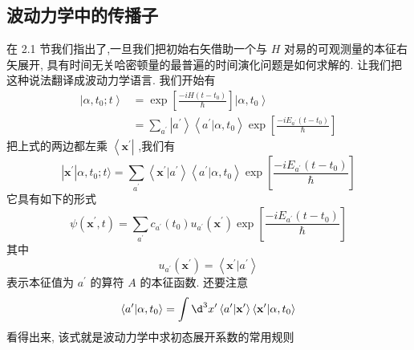 \subsection{波动力学中的传播子}
在 2.1 节我们指出了,一旦我们把初始右矢借助一个与 $H$ 对易的可观测量的本征右矢展开, 具有时间无关哈密顿量的最普遍的时间演化问题是如何求解的. 让我们把这种说法翻译成波动力学语言. 我们开始有
\begin{equation}
\begin{aligned}
	\left| {\alpha ,{t}_{0};t}\right\rangle &= \exp \left\lbrack \frac{-{iH}\left( {t - {t}_{0}}\right) }{\hbar }\right\rbrack \left| {\alpha ,{t}_{0}}\right\rangle\\
	&= \mathop{\sum }\limits_{{a}^{\prime }}\left| {a}^{\prime }\right\rangle \left\langle {{a}^{\prime } | \alpha ,{t}_{0}}\right\rangle \exp \left\lbrack \frac{-i{E}_{{a}^{\prime }}\left( {t - {t}_{0}}\right) }{\hbar }\right\rbrack
\end{aligned}
\end{equation}
把上式的两边都左乘 $\left\langle {\mathbf{x}}^{\prime }\right|$ ,我们有
\begin{equation}
\left| {\mathbf{x}}^{\prime }\right| \alpha ,{t}_{0};t\rangle = \mathop{\sum }\limits_{{a}^{\prime }}\left\langle {{\mathbf{x}}^{\prime } | {a}^{\prime }}\right\rangle \left\langle {{a}^{\prime } | \alpha ,{t}_{0}}\right\rangle \exp \left\lbrack \frac{-i{E}_{{a}^{\prime }}\left( {t - {t}_{0}}\right) }{\hbar }\right\rbrack
\end{equation}
它具有如下的形式
\begin{equation}
\psi \left( {{\mathbf{x}}^{\prime }, t}\right) = \mathop{\sum }\limits_{{a}^{\prime }}{c}_{{a}^{\prime }}\left( {t}_{0}\right) {u}_{{a}^{\prime }}\left( {\mathbf{x}}^{\prime }\right) \exp \left\lbrack \frac{-i{E}_{{a}^{\prime }}\left( {t - {t}_{0}}\right) }{\hbar }\right\rbrack
\end{equation}
其中
\begin{equation}
{u}_{{a}^{\prime }}\left( {\mathbf{x}}^{\prime }\right) = \left\langle {{\mathbf{x}}^{\prime } | {a}^{\prime }}\right\rangle
\end{equation}
表示本征值为 ${a}^{\prime }$ 的算符 $A$ 的本征函数. 还要注意
\begin{equation}
\left\langle {{a}^{\prime } | \alpha ,{t}_{0}}\right\rangle = \int {\d}^{3}{x}^{\prime }\left\langle {{a}^{\prime } | {\mathbf{x}}^{\prime }}\right\rangle \left\langle {{\mathbf{x}}^{\prime } | \alpha ,{t}_{0}}\right\rangle
\end{equation}
看得出来, 该式就是波动力学中求初态展开系数的常用规则
